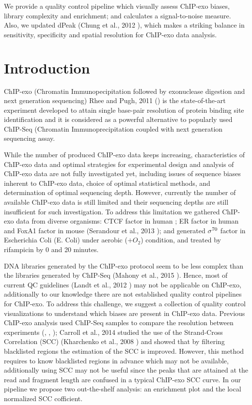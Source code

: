 \documentclass[11pt]{article}\usepackage[]{graphicx}\usepackage[]{color}
\begin{document}
    We provide a quality control pipeline which visually assess
    ChIP-exo biases, library complexity and enrichment; and calculates
    a signal-to-noise measure. Also, we updated dPeak (Chung et al.,
    2012 \cite{dpeak}), which makes a striking balance in sensitivity,
    specificity and spatial resolution for ChIP-exo data analysis.

\newpage

\section{Introduction}
\label{sec:intro}


ChIP-exo (Chromatin Immunopecipitation followed by exonuclease
digestion and next generation sequencing) Rhee and Pugh, 2011
(\cite{exo1}) is the state-of-the-art experiment developed to attain
single base-pair resolution of protein binding site identification and
it is considered as a powerful alternative to popularly used ChIP-Seq
(Chromatin Immunoprecipitation coupled with next generation sequencing
 assay.

While the number of produced ChIP-exo data keeps increasing,
characteristics of ChIP-exo data and optimal strategies for
experimental design and analysis of ChIP-exo data are not fully
investigated yet, including issues of sequence biases inherent to
ChIP-exo data, choice of optimal statistical methods, and
determination of optimal sequencing depth. However, currently the
number of available ChIP-exo data is still limited and their
sequencing depths are still insufficient for such investigation. To
address this limitation we gathered ChIP-exo data from diverse
organisms: CTCF factor in human \cite{exo1}; ER factor in human and
FoxA1 factor in mouse (Serandour et al., 2013 \cite{exoillumina}); and
generated $\sigma^{70}$ factor in Escherichia Coli (E. Coli) under
aerobic ($ + O_2$) condition, and treated by rifampicin by 0 and 20
minutes.

DNA libraries generated by the ChIP-exo protocol seem to be less
complex than the libraries generated by ChIP-Seq (Mahony et al., 2015
\cite{exo_review}). Hence, most of current QC guidelines (Landt et
al., 2012 \cite{encode_qc}) may not be applicable on ChIP-exo,
additionally to our knowledge there are not established quality
control pipelines for ChIP-exo. To address this challenge, we suggest
a collection of quality control visualizations to understand which
biases are present in ChIP-exo data. Previous ChIP-exo analysis used
ChIP-Seq samples to compare the resolution between experiments
(\cite{exo1}, \cite{exo2}, \cite{exoillumina}); Carroll et al., 2014
\cite{carroll.qc} studied the use of the Strand-Cross Correlation
(SCC) (Kharchenko et al., 2008 \cite{strandcc}) and showed that by
filtering blacklisted regions the estimation of the SCC is
improved. However, this method requires to know blacklisted regions in
advance which may not be available, additionally using SCC may not be
useful since the peaks that are attained at the read and fragment
length are confused in a typical ChIP-exo SCC curve.  In our pipeline
we propose two out-the-shelf analysis: an enrichment plot and the
local normalized SCC cofficient.
\end{document}
